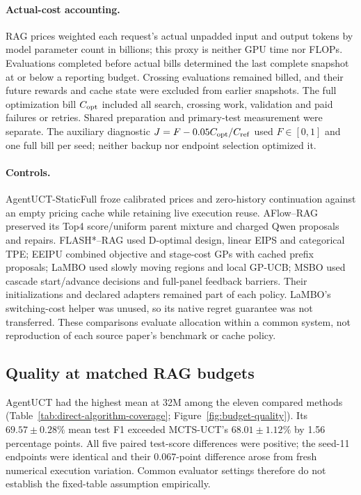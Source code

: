 \paragraph{Actual-cost accounting.}
RAG prices weighted each request's actual unpadded input and output tokens
by model parameter count in billions; this proxy is neither GPU time nor
FLOPs. Evaluations completed before actual bills determined the last complete
snapshot at or below a reporting budget. Crossing evaluations remained
billed, and their future rewards and cache state were excluded from earlier
snapshots. The full optimization bill $C_{\rm opt}$ included all search,
crossing work, validation and paid failures or retries. Shared preparation
and primary-test measurement were separate. The auxiliary diagnostic
$J=F-0.05C_{\rm opt}/C_{\rm ref}$ used $F\in[0,1]$ and one full bill per
seed; neither backup nor endpoint selection optimized it.

\paragraph{Controls.}
AgentUCT-StaticFull froze calibrated prices and zero-history continuation
against an empty pricing cache while retaining live execution reuse.
AFlow--RAG preserved its Top4 score/uniform parent mixture and charged
Qwen proposals and repairs. FLASH*--RAG used D-optimal design, linear EIPS
and categorical TPE; EEIPU combined objective and stage-cost GPs with cached
prefix proposals; LaMBO used slowly moving regions and local GP-UCB; MSBO
used cascade start/advance decisions and full-panel feedback barriers.
Their initializations and declared adapters remained part of each policy.
LaMBO's switching-cost helper was unused, so its native regret guarantee
was not transferred. These comparisons evaluate allocation within a common
system, not reproduction of each source paper's benchmark or cache policy.

\subsection{Quality at matched RAG budgets}
\label{sec:stage-results}
AgentUCT had the highest mean at 32M among the eleven compared methods
(Table~\ref{tab:direct-algorithm-coverage}; Figure~\ref{fig:budget-quality}).
Its $69.57\pm0.28\%$ mean test F1 exceeded MCTS-UCT's $68.01\pm1.12\%$
by 1.56 percentage points. All five paired test-score differences were
positive; the seed-11 endpoints were identical and their 0.067-point
difference arose from fresh numerical execution variation. Common evaluator
settings therefore do not establish the fixed-table assumption empirically.

